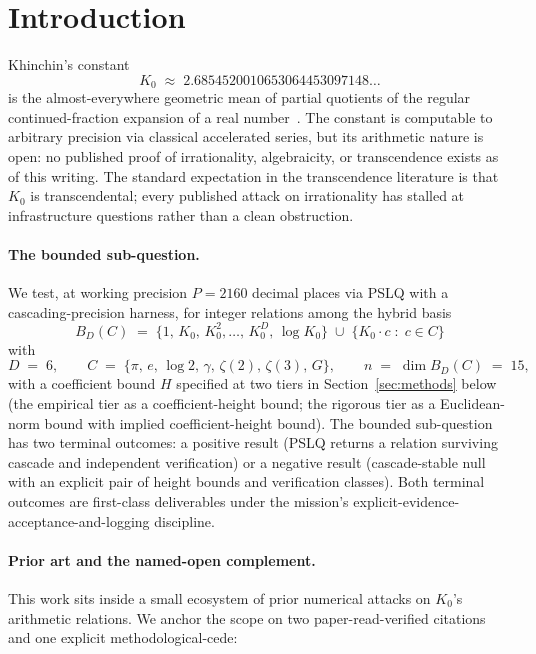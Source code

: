 \documentclass[11pt,a4paper]{article}
\newcommand{\K}{K_{0}}
\newcommand{\BDC}{B_{D}(C)}
\begin{document}
\section{Introduction}

Khinchin's constant
\[
  \K \;\approx\; 2.6854520010653064453097148\ldots
\]
is the almost-everywhere geometric mean of partial quotients of the regular
continued-fraction expansion of a real number~\cite{khinchin1934}.
The constant is computable to arbitrary precision via classical accelerated
series, but its arithmetic nature is open: no published proof of
irrationality, algebraicity, or transcendence exists as of this writing.
The standard expectation in the transcendence literature is that $\K$ is
transcendental; every published attack on irrationality has stalled at
infrastructure questions rather than a clean obstruction.

\paragraph{The bounded sub-question.}
We test, at working precision $P = 2160$ decimal places via PSLQ with a
cascading-precision harness, for integer relations among the hybrid basis
\begin{equation}\label{eq:basis}
  \BDC \;=\; \bigl\{1,\, \K,\, \K^{2}, \ldots,\, \K^{D},\, \log\K\bigr\}
  \;\cup\;
  \bigl\{\K \cdot c \;:\; c \in C\bigr\}
\end{equation}
with
\begin{equation}\label{eq:cset}
  D \;=\; 6, \qquad
  C \;=\; \bigl\{\pi,\, e,\, \log 2,\, \gamma,\, \zeta(2),\, \zeta(3),\, G\bigr\},
  \qquad
  n \;=\; \dim \BDC \;=\; 15,
\end{equation}
with a coefficient bound $H$ specified at two tiers in
Section~\ref{sec:methods} below (the empirical tier as a coefficient-height
bound; the rigorous tier as a Euclidean-norm bound with implied
coefficient-height bound).
The bounded sub-question has two terminal outcomes: a positive result
(PSLQ returns a relation surviving cascade and independent verification)
or a negative result (cascade-stable null with an explicit pair of height
bounds and verification classes).
Both terminal outcomes are first-class deliverables under the mission's
explicit-evidence-acceptance-and-logging discipline.

\paragraph{Prior art and the named-open complement.}
This work sits inside a small ecosystem of prior numerical attacks on $\K$'s
arithmetic relations.
We anchor the scope on two paper-read-verified citations and one explicit
methodological-cede:
\end{document}
